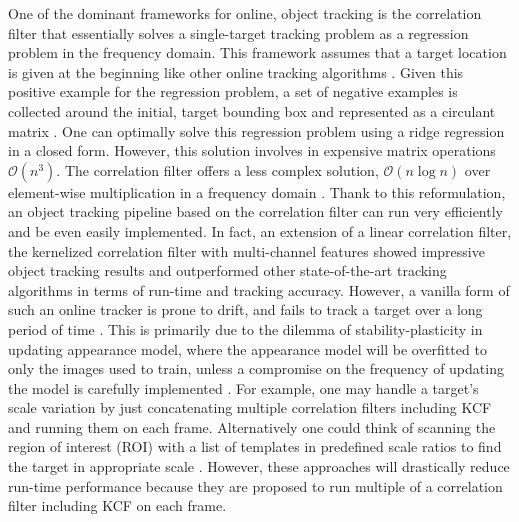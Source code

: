 \documentclass[10pt,twocolumn,letterpaper]{article}
\begin{document}
One of the dominant frameworks for online, object tracking is the
correlation filter that essentially solves a single-target tracking
problem as a regression problem in the frequency domain. This
framework assumes that a target location is given at the beginning
like other online tracking algorithms
\cite{smeulders2014survey}. Given this positive example for the
regression problem, a set of negative examples is collected around the
initial, target bounding box and represented as a circulant matrix
\cite{henriques2015high}. One can optimally solve this regression
problem using a ridge regression in a closed form. However, this
solution involves in expensive matrix operations
$\mathcal{O}(n^{3})$. The correlation filter offers a less complex
solution, $\mathcal{O}(n\log n)$ over element-wise multiplication in a
frequency domain \cite{bolme2010visual,henriques2015high}. Thank to
this reformulation, an object tracking pipeline based on the
correlation filter can run very efficiently and be even easily
implemented. In fact, an extension of a linear correlation filter, the
kernelized correlation filter with multi-channel features
\cite{henriques2015high} showed impressive object tracking results and
outperformed other state-of-the-art tracking algorithms in terms of
run-time and tracking accuracy. However, a vanilla form of such an
online tracker is prone to drift, and fails to track a target over a
long period of time \cite{henriques2015high}. This is primarily due to
the dilemma of stability-plasticity in updating appearance model,
where the appearance model will be overfitted to only the images used
to train, unless a compromise on the frequency of updating the model
is carefully implemented \cite{santner2010prost}. For example, one may
handle a target's scale variation by just concatenating multiple
correlation filters including KCF and running them on each
frame. Alternatively one could think of scanning the region of
interest (ROI) with a list of templates in predefined scale ratios to
find the target in appropriate scale
\cite{henriques2015high,tang2015multi,ma2015long,bibi2015multi,li2014scale}. However,
these approaches will drastically reduce run-time performance because
they are proposed to run multiple of a correlation filter including
KCF on each frame.
\end{document}
